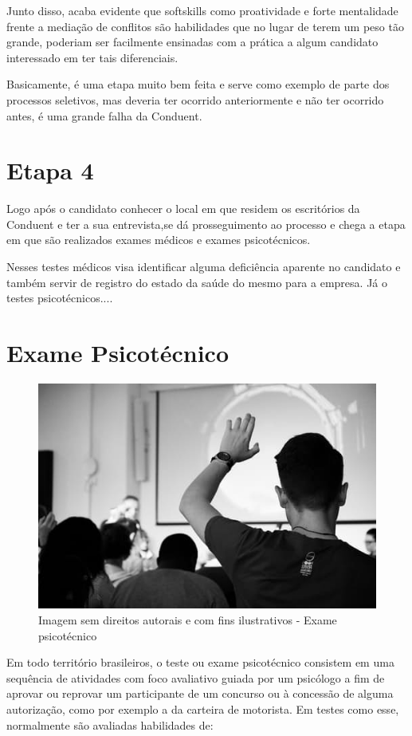 \documentclass[12pt]{article}
\begin{document}
Junto disso, acaba evidente que softskills como proatividade e forte mentalidade frente a mediação de conflitos são habilidades que no lugar de terem um peso tão grande, poderiam ser facilmente ensinadas com a prática a algum candidato interessado em ter tais diferenciais.

Basicamente, é uma etapa muito bem feita e serve como exemplo de parte dos processos seletivos, mas deveria ter ocorrido anteriormente e não ter ocorrido antes, é uma grande falha da Conduent.


\section{Etapa 4}
Logo após o candidato conhecer o local em que residem os escritórios da Conduent e ter a sua entrevista,se dá prosseguimento ao processo e chega a etapa em que são realizados exames médicos e exames psicotécnicos. 

Nesses testes médicos visa identificar alguma deficiência aparente no candidato e também servir de registro do estado da saúde do mesmo para a empresa. Já o testes psicotécnicos....

\section{Exame Psicotécnico}

\begin{figure}[h]
	\centering
	\includegraphics[scale=0.5]{psychotechnicalPeople}
	\caption{Imagem sem direitos autorais e com fins ilustrativos - Exame psicotécnico}
	\label{fig:mesh1}
\end{figure}

Em todo território brasileiros, o teste ou exame psicotécnico consistem em uma sequência de atividades com foco avaliativo guiada por um psicólogo a fim de aprovar ou reprovar um participante de um concurso ou à concessão de alguma autorização, como por exemplo a da carteira de motorista. Em testes como esse, normalmente são avaliadas habilidades de:
\end{document}
